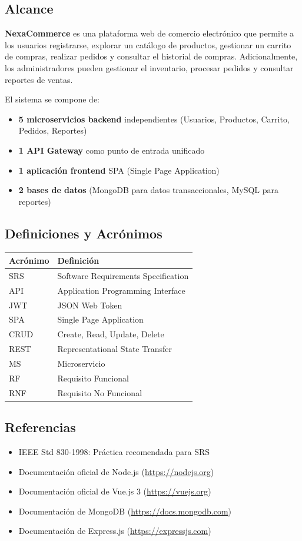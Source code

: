 \documentclass[12pt,a4paper]{article}
\begin{document}
\subsection{Alcance}
\textbf{NexaCommerce} es una plataforma web de comercio electr\'onico que permite a los usuarios registrarse, explorar un cat\'alogo de productos, gestionar un carrito de compras, realizar pedidos y consultar el historial de compras. Adicionalmente, los administradores pueden gestionar el inventario, procesar pedidos y consultar reportes de ventas.

El sistema se compone de:
\begin{itemize}
    \item \textbf{5 microservicios backend} independientes (Usuarios, Productos, Carrito, Pedidos, Reportes)
    \item \textbf{1 API Gateway} como punto de entrada unificado
    \item \textbf{1 aplicaci\'on frontend} SPA (Single Page Application)
    \item \textbf{2 bases de datos} (MongoDB para datos transaccionales, MySQL para reportes)
\end{itemize}

\subsection{Definiciones y Acr\'onimos}
\begin{table}[H]
\centering
\begin{tabular}{ll}
\toprule
\textbf{Acr\'onimo} & \textbf{Definici\'on} \\
\midrule
SRS & Software Requirements Specification \\
API & Application Programming Interface \\
JWT & JSON Web Token \\
SPA & Single Page Application \\
CRUD & Create, Read, Update, Delete \\
REST & Representational State Transfer \\
MS & Microservicio \\
RF & Requisito Funcional \\
RNF & Requisito No Funcional \\
\bottomrule
\end{tabular}
\end{table}

\subsection{Referencias}
\begin{itemize}
    \item IEEE Std 830-1998: Pr\'actica recomendada para SRS
    \item Documentaci\'on oficial de Node.js (\url{https://nodejs.org})
    \item Documentaci\'on oficial de Vue.js 3 (\url{https://vuejs.org})
    \item Documentaci\'on de MongoDB (\url{https://docs.mongodb.com})
    \item Documentaci\'on de Express.js (\url{https://expressjs.com})
\end{itemize}
\end{document}
